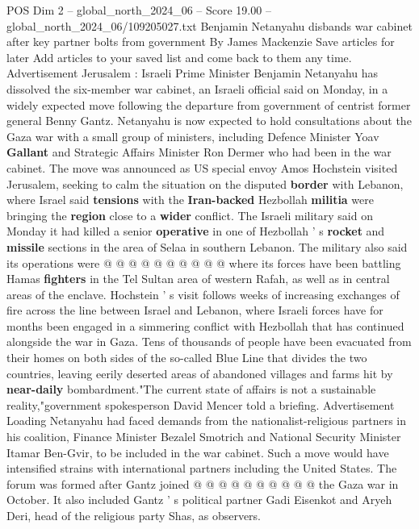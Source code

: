 \begin{textsample}{POS Dim 2 – global\_north\_2024\_06 – Score 19.00 – global\_north\_2024\_06/109205027.txt}  \label{ex:f2_pos_320}
Benjamin Netanyahu disbands war cabinet after key partner bolts from government By James Mackenzie Save articles for later Add articles to your saved list and come back to them any time.
Advertisement Jerusalem : Israeli Prime Minister Benjamin Netanyahu has dissolved the six-member war cabinet, an Israeli official said on Monday, in a widely expected move following the departure from government of centrist former general Benny Gantz.
Netanyahu is now expected to hold consultations about the Gaza war with a small group of ministers, including Defence Minister Yoav \textbf{Gallant} and Strategic Affairs Minister Ron Dermer who had been in the war cabinet.
The move was announced as US special envoy Amos Hochstein visited Jerusalem, seeking to calm the situation on the disputed \textbf{border} with Lebanon, where Israel said \textbf{tensions} with the \textbf{Iran-backed} Hezbollah \textbf{militia} were bringing the \textbf{region} close to a \textbf{wider} conflict.
The Israeli military said on Monday it had killed a senior \textbf{operative} in one of Hezbollah ' s \textbf{rocket} and \textbf{missile} sections in the area of Selaa in southern Lebanon.
The military also said its operations were @ @ @ @ @ @ @ @ @ @ where its forces have been battling Hamas \textbf{fighters} in the Tel Sultan area of western Rafah, as well as in central areas of the enclave.
Hochstein ' s visit follows weeks of increasing exchanges of fire across the line between Israel and Lebanon, where Israeli forces have for months been engaged in a simmering conflict with Hezbollah that has continued alongside the war in Gaza.
Tens of thousands of people have been evacuated from their homes on both sides of the so-called Blue Line that divides the two countries, leaving eerily deserted areas of abandoned villages and farms hit by \textbf{near-daily} bombardment."The current state of affairs is not a sustainable reality,"government spokesperson David Mencer told a briefing.
Advertisement Loading Netanyahu had faced demands from the nationalist-religious partners in his coalition, Finance Minister Bezalel Smotrich and National Security Minister Itamar Ben-Gvir, to be included in the war cabinet.
Such a move would have intensified strains with international partners including the United States.
The forum was formed after Gantz joined @ @ @ @ @ @ @ @ @ @ the Gaza war in October.
It also included Gantz ' s political partner Gadi Eisenkot and Aryeh Deri, head of the religious party Shas, as observers.

\end{textsample}
